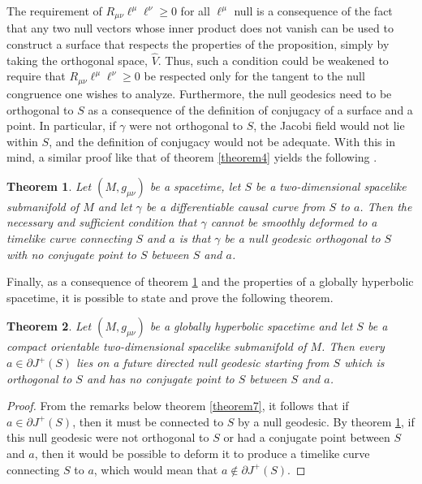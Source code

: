 \documentclass[
12pt,		%
openright,	%
twoside,  %
a4paper,			%
chapter=TITLE,		%
english,			%
french,				%
spanish,			%
brazil				%
]{USPSC-classe/USPSC}
\newtheorem{theorem}{Theorem}[section]
\begin{document}
The requirement of $R_{\mu\nu}\ell^{\mu}\ell^{\nu}\geq 0$ for all $\ell^{\mu}$ null is a consequence of the fact that any two null vectors whose inner product does not vanish can be used to construct a surface that respects the properties of the proposition, simply by taking the orthogonal space, $\hat{V}$. Thus, such a condition could be weakened to require that $R_{\mu\nu}\ell^{\mu}\ell^{\nu}\geq 0$ be respected only for the tangent to the null congruence one wishes to analyze. Furthermore, the null geodesics need to be orthogonal to $S$ as a consequence of the definition of conjugacy of a surface and a point. In particular, if $\gamma$ were not orthogonal to $S$, the Jacobi field would not lie within $S$, and the definition of conjugacy would not be adequate. With this in mind, a similar proof like that of theorem \ref{theorem4} yields the following \cite{Penrose1972}.
\begin{theorem}\label{theorem5}
    Let $(M,g_{\mu\nu})$ be a spacetime, let $S$ be a two-dimensional spacelike submanifold of $M$ and let $\gamma$ be a differentiable causal curve from $S$ to $a$. Then the necessary and sufficient condition that $\gamma$ cannot be smoothly deformed to a timelike curve connecting $S$ and $a$ is that $\gamma$ be a null geodesic orthogonal to $S$ with no conjugate point to $S$ between $S$ and $a$.
\end{theorem}

Finally, as a consequence of theorem \ref{theorem5} and the properties of a globally hyperbolic spacetime, it is possible to state and prove the following theorem.
\begin{theorem}\label{theorem6}
    Let $(M,g_{\mu\nu})$ be a globally hyperbolic spacetime and let $S$ be a compact orientable two-dimensional spacelike submanifold of $M$. Then every $a\in\partial J^+(S)$ lies on a future directed null geodesic starting from $S$ which is orthogonal to $S$ and has no conjugate point to $S$ between $S$ and $a$.
\end{theorem}
\begin{proof}
    From the remarks below theorem \ref{theorem7}, it follows that if $a\in\partial J^+(S)$, then it must be connected to $S$ by a null geodesic. By theorem \ref{theorem5}, if this null geodesic were not orthogonal to $S$ or had a conjugate point between $S$ and $a$, then it would be possible to deform it to produce a timelike curve connecting $S$ to $a$, which would mean that $a\not\in\partial J^+(S)$.
\end{proof}
\end{document}
